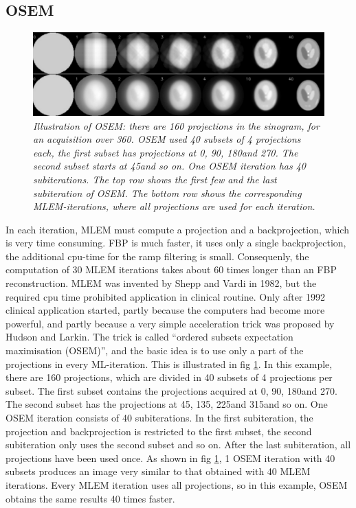 \subsection{OSEM} \label{sec:osem}
\begin{figure}[tb]
\centering
\includegraphics[width=\textwidth]{figs/fig_osem.pdf}
\caption{\label{fig:osem} \emph{Illustration of OSEM: there are 160
    projections in the sinogram, for an acquisition over
    360\textdegree. OSEM used 40 subsets of 4 projections each, the first
    subset has projections at 0\textdegree, 90\textdegree, 180\textdegree and
    270\textdegree. The second subset starts at 45\textdegree and so on. One
    OSEM iteration has 40 subiterations. The top row shows the first
    few and the last subiteration of OSEM. The bottom row shows the
    corresponding MLEM-iterations, where all projections are used for
    each iteration.}}
\end{figure}
In each iteration, MLEM must compute a projection and a
backprojection, which is very time consuming. FBP is much faster, it
uses only a single backprojection, the additional cpu-time for the
ramp filtering is small. Consequenly, the computation of 30 MLEM
iterations takes about 60 times longer than an FBP
reconstruction. MLEM was invented by Shepp and Vardi in 1982, but the
required cpu time prohibited application in clinical routine. Only
after 1992 clinical application started, partly because the computers
had become more powerful, and partly because a very simple
acceleration trick was proposed by Hudson and Larkin. The trick is
called ``ordered subsets expectation maximisation (OSEM)'', and the
basic idea is to use only a part of the projections in every
ML-iteration. This is illustrated in fig \ref{fig:osem}. In this
example, there are 160 projections, which are divided in 40 subsets of
4 projections per subset. The first subset contains the projections
acquired at 0\textdegree, 90\textdegree, 180\textdegree and 270\textdegree. The
second subset has the projections at 45\textdegree, 135\textdegree,
225\textdegree and 315\textdegree and so on. One OSEM iteration consists of
40 subiterations. In the first subiteration, the projection and
backprojection is restricted to the first subset, the second
subiteration only uses the second subset and so on. After the last
subiteration, all projections have been used once. As shown in fig
\ref{fig:osem}, 1 OSEM iteration with 40 subsets produces an image
very similar to that obtained with 40 MLEM iterations. Every MLEM
iteration uses all projections, so in this example, OSEM obtains the
same results 40 times faster.

